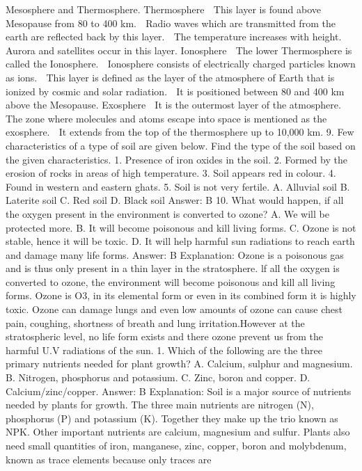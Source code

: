 Mesosphere and Thermosphere.
Thermosphere
 This layer is found above Mesopause from 80 to 400 km.
 Radio waves which are transmitted from the earth are
reflected back by this layer.
 The temperature increases with height.
 Aurora and satellites occur in this layer.
Ionosphere
 The lower Thermosphere is called the Ionosphere.
 Ionosphere consists of electrically charged particles known as
ions.
 This layer is defined as the layer of the atmosphere of Earth
that is ionized by cosmic and solar radiation.
 It is positioned between 80 and 400 km above the Mesopause.
Exosphere
 It is the outermost layer of the atmosphere.
 The zone where molecules and atoms escape into space is
mentioned as the exosphere.
 It extends from the top of the thermosphere up to 10,000 km.
9. Few characteristics of a type of soil are given below. Find
the type of the soil based on the given characteristics.
1. Presence of iron oxides in the soil.
2. Formed by the erosion of rocks in areas of high temperature.
3. Soil appears red in colour.
4. Found in western and eastern ghats.
5. Soil is not very fertile.
A. Alluvial soil
B. Laterite soil
C. Red soil
D. Black soil
Answer: B
10. What would happen, if all the oxygen present in the
environment is converted to ozone?
A. We will be protected more.
B. It will become poisonous and kill living forms.
C. Ozone is not stable, hence it will be toxic.
D. It will help harmful sun radiations to reach earth and damage
many life forms.
Answer: B
Explanation: Ozone is a poisonous gas and is thus only present in a
thin layer in the stratosphere. lf all the oxygen is converted to
ozone, the environment will become poisonous and kill all living forms.
Ozone is O3, in its elemental form or even in its combined form it is
highly toxic. Ozone can damage lungs and even low amounts of ozone
can cause chest pain, coughing, shortness of breath and lung
irritation.However at the stratospheric level, no life form exists and
there ozone prevent us from the harmful U.V radiations of the sun.
1. Which of the following are the three primary nutrients
needed for plant growth?
A. Calcium, sulphur and magnesium.
B. Nitrogen, phosphorus and potassium.
C. Zinc, boron and copper.
D. Calcium/zinc/copper.
Answer: B
Explanation: Soil is a major source of nutrients needed by plants
for growth. The three main nutrients are nitrogen (N), phosphorus
(P) and potassium (K). Together they make up the trio known as NPK.
Other important nutrients are calcium, magnesium and sulfur. Plants
also need small quantities of iron, manganese, zinc, copper, boron and
molybdenum, known as trace elements because only traces are
